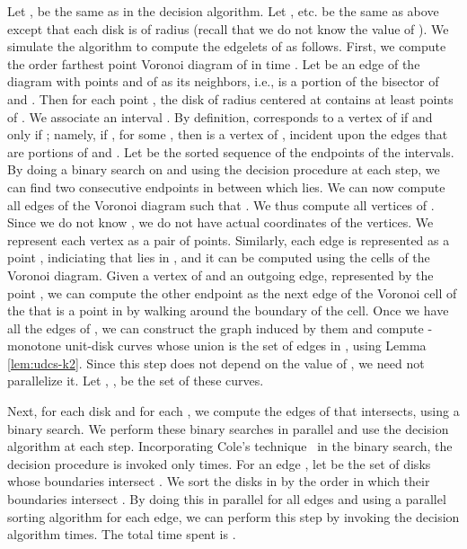 \documentclass[11pt]{myclass}
\begin{document}
Let ,  be the same as in the decision algorithm.  Let ,  etc. be the same as above except that each disk is of radius  (recall that we do not know the value of ).  We simulate the algorithm to compute the edgelets of  as follows.  First, we compute the  order farthest point Voronoi diagram of  in time  \cite{AGSS89}.  Let  be an edge of the diagram with points  and  of  as its neighbors, i.e.,  is a portion of the bisector of  and .  Then for each point , the disk of radius  centered at  contains at least  points of .  We associate an interval .  By definition,  corresponds to a vertex of  if and only if ; namely, if , for some , then  is a vertex of , incident upon the edges that are portions of  and .  
Let  be the sorted sequence of the endpoints of the intervals.
By doing a binary search on  and using the decision procedure at each step, we can find two consecutive endpoints in  between which  lies.  We can now compute all edges  of the Voronoi diagram such that .  We thus compute all vertices of .  
Since we do not know , we do not have actual coordinates of the vertices.  We represent each vertex as a pair of points.  
Similarly, each edge is represented as a point , indiciating that  lies in , and it can be computed using the cells of the Voronoi diagram.  Given a vertex of  and an outgoing edge, represented by the point , we can compute the other endpoint as the next edge  of the Voronoi cell of the  that is a point in  by walking around the boundary of the cell.  
Once we have all the edges of , we can construct the graph induced by them and compute  -monotone unit-disk curves whose union is the set of edges in , using Lemma \ref{lem:udcs-k2}.  Since this step does not depend on the value of , we need not parallelize it.  Let , , be the set of these curves.  

Next, for each disk  and for each , we compute the edges of  that  intersects, using a binary search.  We perform these  binary searches in parallel and use the decision algorithm at each step.  Incorporating Cole's technique~\cite{Col87} in the binary search, the decision procedure is invoked only  times.  For an edge , let  be the set of disks whose boundaries intersect .  We sort the disks in  by the order in which their boundaries intersect .  By doing this in parallel for all edges and using a parallel sorting algorithm for each edge, we can perform this step by invoking the decision algorithm  times.  
The total time spent is .
\end{document}
